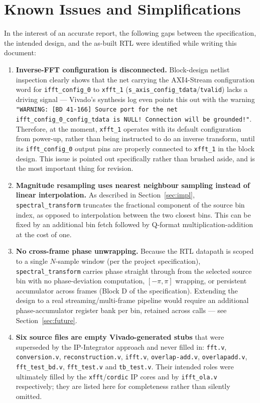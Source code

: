 \documentclass[conference,a4paper]{IEEEtran}
\begin{document}
\section{Known Issues and Simplifications}
\label{sec:limitations}
In the interest of an accurate report, the following gaps between the specification, the
intended design, and the as-built RTL were identified while writing this document:

\begin{enumerate}
    \item \textbf{Inverse-FFT configuration is disconnected.} Block-design
netlist inspection clearly shows that the net carrying the AXI4-Stream configuration
word for \texttt{ifft\_config\_0} to \texttt{xfft\_1} (\texttt{s\_axis\_config\_tdata}/\texttt{tvalid})
lacks a driving signal --- Vivado's synthesis log even points this out with the warning
\texttt{"WARNING: [BD 41-166] Source port for the net ifft\_config\_0\_config\_tdata is
NULL! Connection will be grounded!"}. Therefore, at the moment, \texttt{xfft\_1} operates with
its default configuration from power-up, rather than being instructed to do an inverse transform,
until its \texttt{ifft\_config\_0} output pins are properly connected to \texttt{xfft\_1} in the block
design. This issue is pointed out specifically rather than brushed aside, and is the most important thing
for revision. 
\item \textbf{Magnitude resampling uses nearest neighbour sampling instead of
linear interpolation.} As described in Section~\ref{sec:impl}, \texttt{spectral\_transform} truncates the fractional component of the source bin index,
as opposed to interpolation between the two closest bins. This can be fixed by an additional bin fetch followed by Q-format multiplication-addition at the cost of one.
    \item \textbf{No cross-frame phase unwrapping.} Because the RTL datapath is scoped to a
    single $N$-sample window (per the project specification), \texttt{spectral\_transform}
    carries phase straight through from the selected source bin with no phase-deviation
    computation, $[-\pi,\pi]$ wrapping, or persistent accumulator across frames (Block D of
    the specification). Extending the design to a real streaming/multi-frame pipeline would
    require an additional phase-accumulator register bank per bin, retained across calls ---
    see Section~\ref{sec:future}.
    \item \textbf{Six source files are empty Vivado-generated stubs} that were superseded by
    the IP-Integrator approach and never filled in: \texttt{fft.v}, \texttt{conversion.v},
    \texttt{reconstruction.v}, \texttt{ifft.v}, \texttt{overlap-add.v}, \texttt{overlapadd.v},
    \texttt{fft\_test\_bd.v}, \texttt{fft\_test.v} and \texttt{tb\_test.v}. Their intended
    roles were ultimately filled by the \texttt{xfft}/\texttt{cordic} IP cores and by
    \texttt{ifft\_ola.v} respectively; they are listed here for completeness rather than
    silently omitted.
\end{enumerate}
\end{document}
